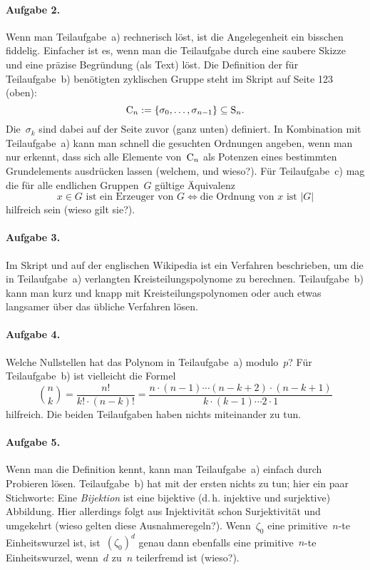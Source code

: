 \documentclass{../algblatt}
\begin{document}
\paragraph{Aufgabe 2.} Wenn man Teilaufgabe~a) rechnerisch löst, ist die
Angelegenheit ein bisschen fiddelig. Einfacher ist es, wenn man die Teilaufgabe
durch eine saubere Skizze und eine präzise Begründung (als Text) löst. Die
Definition der für Teilaufgabe~b) benötigten zyklischen Gruppe steht im Skript
auf Seite 123 (oben):
\[ \mathrm{C}_n := \{ \sigma_0, \ldots, \sigma_{n-1} \} \subseteq \mathrm{S}_n. \]
Die~$\sigma_k$ sind dabei auf der Seite zuvor (ganz unten) definiert.
In Kombination mit Teil\-auf\-ga\-be~a) kann man schnell die gesuchten Ordnungen
angeben, wenn man nur erkennt, dass sich alle Elemente von~$\mathrm{C}_n$ als
Potenzen eines bestimmten Grundelements ausdrücken lassen (welchem, und
wieso?). Für Teilaufgabe~c) mag die für alle endlichen Gruppen~$G$ gültige
Äquivalenz
\[ \text{$x \in G$ ist ein Erzeuger von~$G$}
  \Longleftrightarrow
  \text{die Ordnung von~$x$ ist~$|G|$} \]
hilfreich sein (wieso gilt sie?).

\paragraph{Aufgabe 3.} Im Skript und auf der englischen Wikipedia ist ein
Verfahren beschrieben, um die in Teilaufgabe~a) verlangten
Kreisteilungspolynome zu berechnen. Teilaufgabe~b) kann man kurz und knapp mit
Kreisteilungspolynomen oder auch etwas langsamer über das übliche Verfahren
lösen.

\paragraph{Aufgabe 4.} Welche Nullstellen hat das Polynom in Teilaufgabe~a)
modulo~$p$?
Für Teilaufgabe~b) ist vielleicht die Formel
\[ \binom{n}{k} = \frac{n!}{k! \cdot (n-k)!} =
  \frac{n \cdot (n-1) \cdots (n-k+2) \cdot (n-k+1)}{k \cdot (k-1) \cdots 2
  \cdot 1} \]
hilfreich. Die beiden Teilaufgaben haben nichts miteinander zu tun.

\paragraph{Aufgabe 5.} Wenn man die Definition kennt, kann man Teilaufgabe~a)
einfach durch Probieren lösen. Teilaufgabe~b) hat mit der ersten nichts zu tun;
hier ein paar Stichworte:
Eine \emph{Bijektion} ist eine bijektive (d.\,h. injektive und surjektive)
Abbildung. Hier allerdings folgt aus Injektivität schon Surjektivität und
umgekehrt (wieso gelten diese Ausnahmeregeln?). Wenn~$\zeta_0$ eine
primitive~$n$-te Einheitswurzel ist, ist~$(\zeta_0)^d$ genau dann ebenfalls eine
primitive~$n$-te Einheitswurzel, wenn~$d$ zu~$n$ teilerfremd ist (wieso?).
\end{document}
